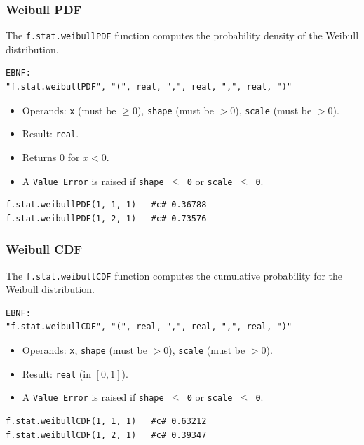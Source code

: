 \subsubsection{Weibull PDF}
The \texttt{f.stat.weibullPDF} function computes the probability density of the Weibull distribution.
\begin{verbatim}
EBNF:
"f.stat.weibullPDF", "(", real, ",", real, ",", real, ")"
\end{verbatim}
\begin{itemize}
\item Operands: \texttt{x} (must be $\geq 0$), \texttt{shape} (must be $> 0$), \texttt{scale} (must be $> 0$).
\item Result: \texttt{real}.
\item Returns 0 for $x < 0$.
\item A \texttt{Value Error} is raised if \texttt{shape $\leq$ 0} or \texttt{scale $\leq$ 0}.
\end{itemize}
\begin{verbatim}
f.stat.weibullPDF(1, 1, 1)   #c# 0.36788
f.stat.weibullPDF(1, 2, 1)   #c# 0.73576
\end{verbatim}

\subsubsection{Weibull CDF}
The \texttt{f.stat.weibullCDF} function computes the cumulative probability for the Weibull distribution.
\begin{verbatim}
EBNF:
"f.stat.weibullCDF", "(", real, ",", real, ",", real, ")"
\end{verbatim}
\begin{itemize}
\item Operands: \texttt{x}, \texttt{shape} (must be $> 0$), \texttt{scale} (must be $> 0$).
\item Result: \texttt{real} (in $[0, 1]$).
\item A \texttt{Value Error} is raised if \texttt{shape $\leq$ 0} or \texttt{scale $\leq$ 0}.
\end{itemize}
\begin{verbatim}
f.stat.weibullCDF(1, 1, 1)   #c# 0.63212
f.stat.weibullCDF(1, 2, 1)   #c# 0.39347
\end{verbatim}

